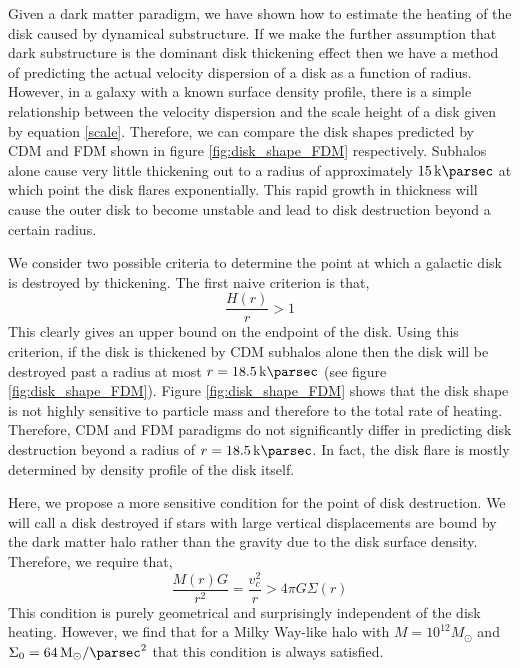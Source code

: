 \documentclass[usenatbib]{mnras}
\begin{document}
Given a dark matter paradigm, we have shown how to estimate the heating of the disk caused by dynamical substructure. If we make the further assumption that dark substructure is the dominant disk thickening effect then we have a method of predicting the actual velocity dispersion of a disk as a function of radius. However, in a galaxy with a known surface density   profile, there is a simple relationship between the velocity dispersion and the scale height of a disk given by equation \eqref{scale}. Therefore, we can compare the disk shapes predicted by CDM and FDM shown in figure \ref{fig:disk_shape_FDM} respectively. Subhalos alone cause very little thickening out to a radius of approximately $\SI{15}{\kilo \parsec}$ at which point the disk flares exponentially. This rapid growth in thickness will cause the outer disk to become unstable and lead to disk destruction beyond a certain radius. 
\par 
We consider two possible criteria to determine the point at which a galactic disk is destroyed by thickening. The first naive criterion is that, 
\begin{equation}
\frac{H(r)}{r} > 1
\end{equation}
This clearly gives an upper bound on the endpoint of the disk. Using this criterion, if the disk is thickened by CDM subhalos alone then the disk will be destroyed past a radius at most $r = \SI{18.5}{\kilo \parsec}$ (see figure \ref{fig:disk_shape_FDM}). Figure \ref{fig:disk_shape_FDM} shows that the disk shape is not highly sensitive to particle mass and therefore to the total rate of heating. Therefore, CDM and FDM paradigms do not significantly differ in predicting disk destruction beyond a radius of $r = \SI{18.5}{\kilo \parsec}$. In fact, the disk flare is mostly determined by density profile of the disk itself.  
\par
Here, we propose a more sensitive condition for the point of disk destruction. We will call a disk destroyed if stars with large vertical displacements are bound by the dark matter halo rather than the gravity due to the disk surface density. Therefore, we require that,
\begin{equation}
\frac{M(r) G}{r^2} = \frac{v_c^2}{r} > 4 \pi G \Sigma(r) 
\end{equation}   
This condition is purely geometrical and surprisingly independent of the disk heating. However, we find that for a Milky Way-like halo with $M = 10^{12} M_{\odot}$ and $\Sigma_0 = \SI{64}{M_{\odot} \per \parsec \squared}$ that this condition is always satisfied. 
\end{document}
